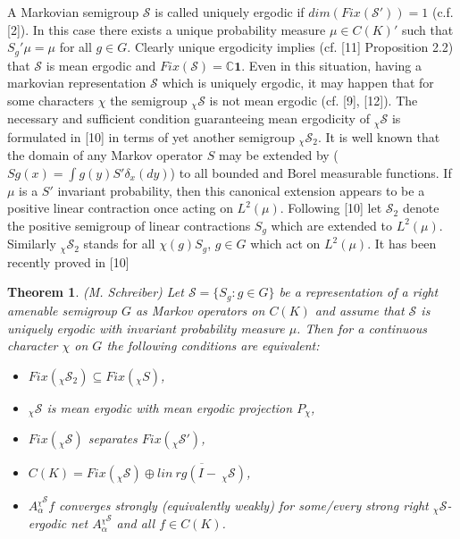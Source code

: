 \documentclass{amsart}
\newtheorem{thm}{Theorem}[section]
\theoremstyle{definition}
\theoremstyle{remark}
\numberwithin{equation}{section}
\begin{document}
A Markovian semigroup $\mathcal{S}$ is called uniquely ergodic if $dim(Fix(\mathcal{S}')) = 1$ (c.f. [2]). In this case there exists a unique probability measure $\mu \in C(K)'$ such that $S_g'\mu = \mu $ for all $g\in G$. Clearly unique ergodicity implies (cf. [11] Proposition 2.2) that $\mathcal{S}$ is mean ergodic and $Fix(\mathcal{S}) = \mathbb{C}\mathbf{1}$. Even in this situation, having a markovian representation $\mathcal{S}$ which is uniquely ergodic, it may happen that for some characters $\chi $ the semigroup $_{\chi}\mathcal{S}$  is not mean ergodic (cf. [9], [12]). The necessary and sufficient condition guaranteeing mean ergodicity of $_{\chi}\mathcal{S}$ is formulated in [10] in terms of yet another semigroup $_{\chi}\mathcal{S}_2$. It is well known that the domain of any Markov operator $S$ may be extended by ($Sg(x) = \int g(y) S'\delta_x(dy)$)  to  all bounded and Borel measurable functions. If $\mu $ is a $S'$ invariant probability, then this canonical extension appears to be a positive linear contraction once acting on $L^2(\mu)$. Following [10] let $\mathcal{S}_2$ denote the positive semigroup of linear contractions $S_g$ which are extended to $L^2(\mu )$. Similarly $_{\chi}\mathcal{S}_2$ stands for all $\chi(g)S_g$, $g\in G$ which act on $L^2(\mu )$. It has been recently proved in [10]
\begin{thm} (M. Schreiber) Let $\mathcal{S} = \{ S_g : g\in G \}$ be a representation of a right amenable semigroup $G$ as Markov operators on $C(K)$ and assume that $\mathcal{S}$ is uniquely ergodic with invariant probability measure $\mu $. Then for a continuous character $\chi $ on $G$ the following conditions are equivalent:
\begin{itemize}
\item[(1)] $Fix(_{\chi}\mathcal{S}_2 ) \subseteq Fix(_{\chi}S)$,
\item[(2)] $_{\chi}\mathcal{S}$ is mean ergodic with mean ergodic projection $P_{\chi}$,
\item[(3)] $Fix(\mathcal{_{\chi}S})$ separates $Fix(_{\chi}\mathcal{S}')$,
\item[(4)] $C(K) = Fix(_{\chi}\mathcal{S})\oplus \overline{lin\ rg(I -\ _{\chi}\mathcal{S})} $,
\item[(5)] $A_{\alpha}^{_{\chi}\mathcal{S}}f$ converges strongly (equivalently weakly) for some/every strong right $_{\chi}\mathcal{S}$-ergodic net $A_{\alpha}^{_{\chi}\mathcal{S}}$ and all $f\in C(K)$.
\end{itemize}
\end{thm}
\end{document}
